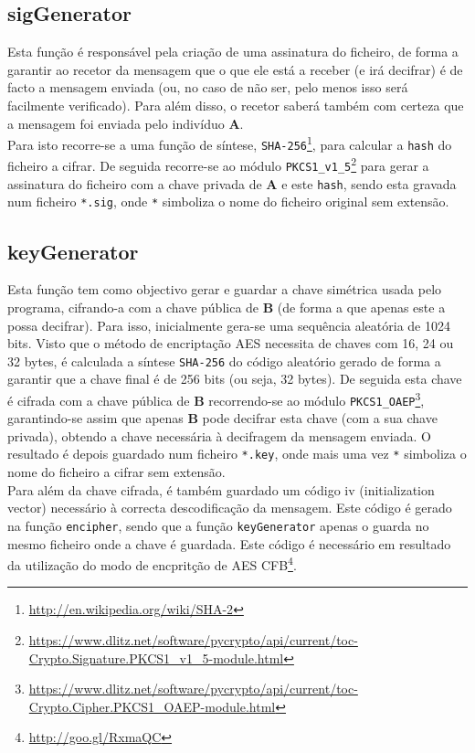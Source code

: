\documentclass[a4paper,11pt,openright,oneside]{report}
\begin{document}
\subsection{sigGenerator}

Esta função é responsável pela criação de uma assinatura do ficheiro, de forma a garantir ao recetor da mensagem que o que ele está a receber (e irá decifrar) é de facto a mensagem enviada (ou, no caso de não ser, pelo menos isso será facilmente verificado). Para além disso, o recetor saberá também com certeza que a mensagem foi enviada pelo indivíduo \textbf{A}.\\

Para isto recorre-se a uma função de síntese, \verb|SHA-256|\footnote{\url{http://en.wikipedia.org/wiki/SHA-2}}, para calcular a \verb|hash| do ficheiro a cifrar. De seguida recorre-se ao módulo \verb|PKCS1_v1_5|\footnote{\url{https://www.dlitz.net/software/pycrypto/api/current/toc-Crypto.Signature.PKCS1_v1_5-module.html}} para gerar a assinatura do ficheiro com a chave privada de \textbf{A} e este \verb|hash|, sendo esta gravada num ficheiro \verb|*.sig|, onde \verb|*| simboliza o nome do ficheiro original sem extensão.

\subsection{keyGenerator}

Esta função tem como objectivo gerar e guardar a chave simétrica usada pelo programa, cifrando-a com a chave pública de \textbf{B} (de forma a que apenas este a possa decifrar). Para isso, inicialmente gera-se uma sequência aleatória de 1024 bits. Visto que o método de encriptação AES necessita de chaves com 16, 24 ou 32 bytes, é calculada a síntese \verb|SHA-256| do código aleatório gerado de forma a garantir que a chave final é de 256 bits (ou seja, 32 bytes). De seguida esta chave é cifrada com a chave pública de \textbf{B} recorrendo-se ao módulo \verb|PKCS1_OAEP|\footnote{\url{https://www.dlitz.net/software/pycrypto/api/current/toc-Crypto.Cipher.PKCS1_OAEP-module.html}}, garantindo-se assim que apenas \textbf{B} pode decifrar esta chave (com a sua chave privada), obtendo a chave necessária à decifragem da mensagem enviada. O resultado é depois guardado num ficheiro \verb|*.key|, onde mais uma vez \verb|*| simboliza o nome do ficheiro a cifrar sem extensão.\\

Para além da chave cifrada, é também guardado um código iv (initialization vector) necessário à correcta descodificação da mensagem. Este código é gerado na função \verb|encipher|, sendo que a função \verb|keyGenerator| apenas o guarda no mesmo ficheiro onde a chave é guardada. Este código é necessário em resultado da utilização do modo de encpritção de AES CFB\footnote{\url{http://goo.gl/RxmaQC}}.
\end{document}
